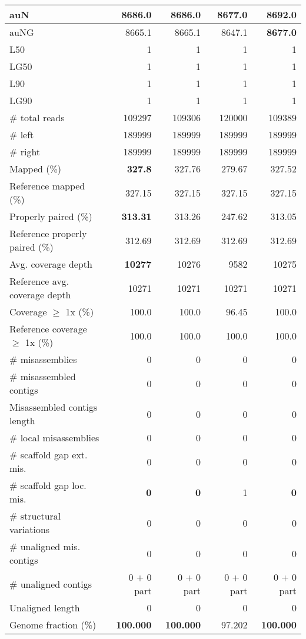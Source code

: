 \documentclass[12pt,a4paper]{article}
\begin{document}
\begin{table}[ht]
\begin{center}
\begin{tabular}{|l*{4}{|r}|}
auN & 8686.0 & 8686.0 & 8677.0 & {\bf 8692.0} \\ \hline
auNG & 8665.1 & 8665.1 & 8647.1 & {\bf 8677.0} \\ \hline
L50 & 1 & 1 & 1 & 1 \\ \hline
LG50 & 1 & 1 & 1 & 1 \\ \hline
L90 & 1 & 1 & 1 & 1 \\ \hline
LG90 & 1 & 1 & 1 & 1 \\ \hline
\# total reads & 109297 & 109306 & 120000 & 109389 \\ \hline
\# left & 189999 & 189999 & 189999 & 189999 \\ \hline
\# right & 189999 & 189999 & 189999 & 189999 \\ \hline
Mapped (\%) & {\bf 327.8} & 327.76 & 279.67 & 327.52 \\ \hline
Reference mapped (\%) & 327.15 & 327.15 & 327.15 & 327.15 \\ \hline
Properly paired (\%) & {\bf 313.31} & 313.26 & 247.62 & 313.05 \\ \hline
Reference properly paired (\%) & 312.69 & 312.69 & 312.69 & 312.69 \\ \hline
Avg. coverage depth & {\bf 10277} & 10276 & 9582 & 10275 \\ \hline
Reference avg. coverage depth & 10271 & 10271 & 10271 & 10271 \\ \hline
Coverage $\geq$ 1x (\%) & 100.0 & 100.0 & 96.45 & 100.0 \\ \hline
Reference coverage $\geq$ 1x (\%) & 100.0 & 100.0 & 100.0 & 100.0 \\ \hline
\# misassemblies & 0 & 0 & 0 & 0 \\ \hline
\# misassembled contigs & 0 & 0 & 0 & 0 \\ \hline
Misassembled contigs length & 0 & 0 & 0 & 0 \\ \hline
\# local misassemblies & 0 & 0 & 0 & 0 \\ \hline
\# scaffold gap ext. mis. & 0 & 0 & 0 & 0 \\ \hline
\# scaffold gap loc. mis. & {\bf 0} & {\bf 0} & 1 & {\bf 0} \\ \hline
\# structural variations & 0 & 0 & 0 & 0 \\ \hline
\# unaligned mis. contigs & 0 & 0 & 0 & 0 \\ \hline
\# unaligned contigs & 0 + 0 part & 0 + 0 part & 0 + 0 part & 0 + 0 part \\ \hline
Unaligned length & 0 & 0 & 0 & 0 \\ \hline
Genome fraction (\%) & {\bf 100.000} & {\bf 100.000} & 97.202 & {\bf 100.000} \\ \hline

\end{tabular}
\end{center}
\end{table}
\end{document}
